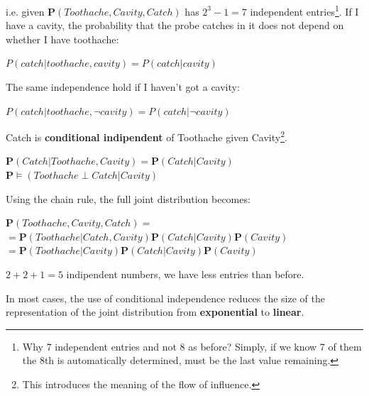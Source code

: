 \begin{example}
    i.e. given $\mathbf{P}(Toothache, Cavity, Catch)$ has $2^3 - 1 = 7$ independent entries\footnote{Why 7 independent entries and not 8 as before? Simply, if we know 7 of them the 8th is automatically determined, must be the last value remaining.}. If I have a cavity, the probability that the probe catches in it does not depend on whether I have toothache: \vspace{3.5pt}
    \begin{center}
        $P(catch|toothache, cavity) = P(catch|cavity)$
    \end{center} \vspace{3.5pt}
    The same independence hold if I haven't got a cavity: \vspace{3.5pt}
    \begin{center}
        $P(catch|toothache, \neg cavity) = P(catch|\neg cavity)$
    \end{center} \vspace{3.5pt}
    Catch is \textbf{conditional indipendent} of Toothache given Cavity\footnote{This introduces the meaning of the flow of influence.}. \vspace{3.5pt}
    \begin{center}
        $\mathbf{P}(Catch|Toothache, Cavity) = \mathbf{P}(Catch|Cavity)$ \vspace{3.5pt} \\
        $\mathbf{P} \models (Toothache \perp Catch|Cavity)$
    \end{center} \vspace{3.5pt}
    Using the chain rule, the full joint distribution becomes: \vspace{3.5pt}
    \begin{center}
        $\mathbf{P}(Toothache,Cavity,Catch) =$ \\
        $= \mathbf{P}(Toothache|Catch,Cavity)\mathbf{P}(Catch|Cavity)\mathbf{P}(Cavity)$ \\
        $= \mathbf{P}(Toothache|Cavity)\mathbf{P}(Catch|Cavity)\mathbf{P}(Cavity)$ \\
    \end{center} \vspace{3.5pt}
    $2 + 2 + 1 = 5$ indipendent numbers, we have less entries than before. \vspace{3.5pt}

    In most cases, the use of conditional independence reduces the size of the representation of the joint distribution from \textbf{exponential} to \textbf{linear}.
\end{example}
